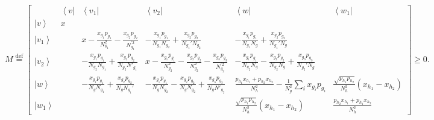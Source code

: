\documentclass{article}
\begin{document}
\noindent
{\footnotesize%
	\begin{minipage}[t]{1\columnwidth}%
		\begin{displaymath}
		M\overset{\text{def}}{=}\left[\begin{array}{c|ccccc}
		& \left\langle v\right| & \left\langle v_{1}\right| & \left\langle v_{2}\right| & \left\langle w\right| & \left\langle w_{1}\right|\\
		\hline \left|v\right\rangle  & x\\
		\left|v_{1}\right\rangle  &  & x-\frac{x_{g_{1}}p_{g_{1}}}{N_{8_{1}}^{2}}-\frac{x_{g_{2}}p_{g_{2}}}{N_{g_{1}}^{\prime2}} & -\frac{x_{g_{1}}p_{g_{1}}}{N_{g_{1}}N_{g_{2}}}+\frac{x_{g_{2}}p_{g_{2}}}{N_{g_{1}}'N_{g_{2}}} & -\frac{x_{g_{1}}p_{g_{1}}}{N_{g_{1}}N_{g}}+\frac{x_{g_{2}}p_{g_{2}}}{N_{g_{1}}'N_{g}}\\
		\left|v_{2}\right\rangle  &  & -\frac{x_{g_{1}}p_{g_{1}}}{N_{g_{2}}N_{g_{1}}}+\frac{x_{g_{2}}p_{g_{2}}}{N_{g_{2}}N'_{g_{1}}} & x-\frac{x_{g_{1}}p_{g_{1}}}{N_{g_{2}}^{2}}-\frac{x_{g_{2}}p_{g_{2}}}{N_{g_{2}}^{2}}-\frac{x_{g_{3}}p_{g_{3}}}{N_{g_{2}}^{\prime2}} & -\frac{x_{g_{1}}p_{g_{1}}}{N_{g_{2}}N_{g}}-\frac{x_{g_{2}}p_{g_{2}}}{N_{g_{2}}N_{g}}+\frac{x_{g_{3}}p_{g_{3}}}{N_{g_{2}}'N_{g}}\\
		\left|w\right\rangle  &  & -\frac{x_{g_{1}}p_{g_{1}}}{N_{g}N_{g_{1}}}+\frac{x_{g_{2}}p_{g_{2}}}{N_{g}N_{g_{1}}'} & -\frac{x_{g_{1}}p_{g_{1}}}{N_{g}N_{g_{2}}}-\frac{x_{g_{2}}p_{g_{2}}}{N_{g}N_{g_{2}}}+\frac{x_{g_{3}}p_{g_{3}}}{N_{g}N'_{g_{2}}} & \frac{p_{h_{1}}x_{h_{1}}+p_{h_{2}}x_{h_{2}}}{N_{h}^{2}}-\frac{1}{N_{g}^{2}}\sum_{i}x_{g_{i}}p_{g_{i}} & \frac{\sqrt{p_{h_{1}}p_{h_{2}}}}{N_{h}^{2}}(x_{h_{1}}-x_{h_{2}})\\
		\left|w_{1}\right\rangle  &  &  &  & \frac{\sqrt{p_{h_{1}}p_{h_{2}}}}{N_{h}^{2}}(x_{h_{1}}-x_{h_{2}}) & \frac{p_{h_{2}}x_{h_{1}}+p_{h_{1}}x_{h_{2}}}{N_{h}^{2}}
		\end{array}\right]\ge0.
		\end{displaymath}
	\end{minipage}
	
}
\end{document}
